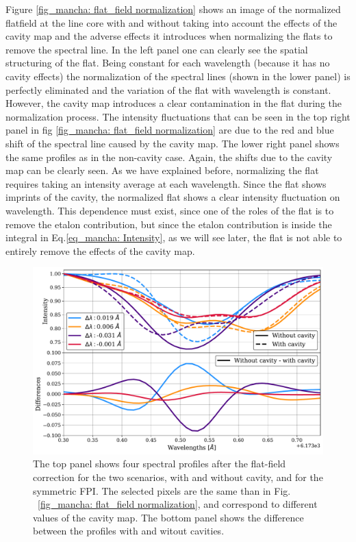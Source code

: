 Figure \ref{fig_mancha: flat_field normalization} shows an image of the normalized flatfield at the line core with and without taking into account the effects of the cavity map and the adverse effects it introduces when normalizing the flats to remove the spectral line. In the left panel one can clearly see the spatial structuring of the flat. Being constant for each wavelength (because it has no cavity effects) the normalization of the spectral lines (shown in the lower panel) is perfectly eliminated and the variation of the flat with wavelength is constant. However, the cavity map introduces a clear contamination in the flat during the normalization process. The intensity fluctuations that can be seen in the top right panel in fig \ref{fig_mancha: flat_field normalization} are due to the red and blue shift of the spectral line caused by the cavity map. The lower right panel shows the same profiles as in the non-cavity case. Again, the shifts due to the cavity map can be clearly seen. As we have explained before, normalizing the flat requires taking an intensity average at each wavelength. Since the flat shows imprints of the cavity, the normalized flat shows a clear intensity fluctuation on  wavelength. This dependence must exist, since one of the roles of the flat is to remove the etalon contribution, but since the etalon contribution is inside the integral in Eq.\eqref{eq_mancha: Intensity}, as we will see later, the flat is not able to entirely remove the effects of the cavity map. 

\begin{figure}
  \begin{minipage}[c]{0.7\textwidth}
    \includegraphics[width=\textwidth]{figures/Mancha/flatfield_norm_differences.pdf}
  \end{minipage}\hfill\hfill
  \begin{minipage}[c]{0.27\textwidth}
    \caption[Profiles after flat-field correction.]{
          The top panel shows four spectral profiles after the flat-field correction for the two scenarios, with and without cavity, and for the symmetric FPI. The selected pixels are the same than in Fig. ~\ref{fig_mancha: flat_field normalization}, and correspond to different values of the cavity map. The bottom panel shows the difference between the profiles with and witout cavities.
    \label{fig_mancha: Profiles_differences}} 
  \end{minipage}
\end{figure}

